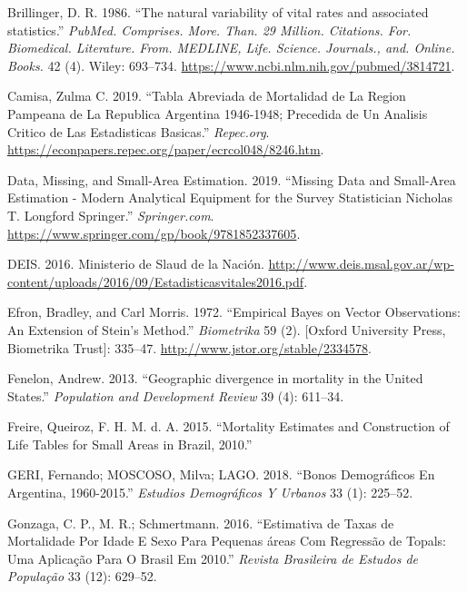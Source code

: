 \documentclass[12pt,]{article}
\begin{document}
\leavevmode\hypertarget{ref-Brillinger1986}{}%
Brillinger, D. R. 1986. ``The natural variability of vital rates and
associated statistics.'' \emph{PubMed. Comprises. More. Than. 29
Million. Citations. For. Biomedical. Literature. From. MEDLINE, Life.
Science. Journals., and. Online. Books.} 42 (4). Wiley: 693--734.
\url{https://www.ncbi.nlm.nih.gov/pubmed/3814721}.

\leavevmode\hypertarget{ref-Camisa_2019}{}%
Camisa, Zulma C. 2019. ``Tabla Abreviada de Mortalidad de La Region
Pampeana de La Republica Argentina 1946-1948; Precedida de Un Analisis
Critico de Las Estadisticas Basicas.'' \emph{Repec.org}.
\url{https://econpapers.repec.org/paper/ecrcol048/8246.htm}.

\leavevmode\hypertarget{ref-Longford2005}{}%
Data, Missing, and Small-Area Estimation. 2019. ``Missing Data and
Small-Area Estimation - Modern Analytical Equipment for the Survey
Statistician \textbar{} Nicholas T. Longford \textbar{} Springer.''
\emph{Springer.com}.
\url{https://www.springer.com/gp/book/9781852337605}.

\leavevmode\hypertarget{ref-DEIS2016}{}%
DEIS. 2016. Ministerio de Slaud de la Nación.
\url{http://www.deis.msal.gov.ar/wp-content/uploads/2016/09/Estadisticasvitales2016.pdf}.

\leavevmode\hypertarget{ref-Efron1972}{}%
Efron, Bradley, and Carl Morris. 1972. ``Empirical Bayes on Vector
Observations: An Extension of Stein's Method.'' \emph{Biometrika} 59
(2). {[}Oxford University Press, Biometrika Trust{]}: 335--47.
\url{http://www.jstor.org/stable/2334578}.

\leavevmode\hypertarget{ref-Fenelon2013}{}%
Fenelon, Andrew. 2013. ``Geographic divergence in mortality in the
United States.'' \emph{Population and Development Review} 39 (4):
611--34.

\leavevmode\hypertarget{ref-FreireEtAl2015}{}%
Freire, Queiroz, F. H. M. d. A. 2015. ``Mortality Estimates and
Construction of Life Tables for Small Areas in Brazil, 2010.''

\leavevmode\hypertarget{ref-GeriMoscoso2018}{}%
GERI, Fernando; MOSCOSO, Milva; LAGO. 2018. ``Bonos Demográficos En
Argentina, 1960-2015.'' \emph{Estudios Demográficos Y Urbanos} 33 (1):
225--52.

\leavevmode\hypertarget{ref-GonzagaSchmertmann2016}{}%
Gonzaga, C. P., M. R.; Schmertmann. 2016. ``Estimativa de Taxas de
Mortalidade Por Idade E Sexo Para Pequenas áreas Com Regressão de
Topals: Uma Aplicação Para O Brasil Em 2010.'' \emph{Revista Brasileira
de Estudos de População} 33 (12): 629--52.
\end{document}
